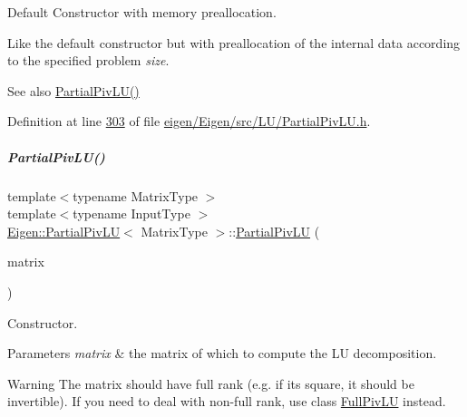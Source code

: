Default Constructor with memory preallocation. 

Like the default constructor but with preallocation of the internal data according to the specified problem {\itshape size}. \begin{DoxySeeAlso}{See also}
\hyperlink{group___l_u___module_a5c04818d354f94a98786d8a44cb709c6}{Partial\+Piv\+L\+U()} 
\end{DoxySeeAlso}


Definition at line \hyperlink{eigen_2_eigen_2src_2_l_u_2_partial_piv_l_u_8h_source_l00303}{303} of file \hyperlink{eigen_2_eigen_2src_2_l_u_2_partial_piv_l_u_8h_source}{eigen/\+Eigen/src/\+L\+U/\+Partial\+Piv\+L\+U.\+h}.

\mbox{\label{group___l_u___module_acf37214aebb54d0e186ae39ac6c41bdf}} 
\subparagraph{\texorpdfstring{Partial\+Piv\+L\+U()}{PartialPivLU()}\hspace{0.1cm}{\footnotesize\ttfamily [3/8]}}
{\footnotesize\ttfamily template$<$typename Matrix\+Type $>$ \\
template$<$typename Input\+Type $>$ \\
\hyperlink{group___l_u___module_class_eigen_1_1_partial_piv_l_u}{Eigen\+::\+Partial\+Piv\+LU}$<$ Matrix\+Type $>$\+::\hyperlink{group___l_u___module_class_eigen_1_1_partial_piv_l_u}{Partial\+Piv\+LU} (\begin{DoxyParamCaption}\item[{const \hyperlink{group___core___module_struct_eigen_1_1_eigen_base}{Eigen\+Base}$<$ Input\+Type $>$ \&}]{matrix }\end{DoxyParamCaption})\hspace{0.3cm}{\ttfamily [explicit]}}

Constructor.


\begin{DoxyParams}{Parameters}
{\em matrix} & the matrix of which to compute the LU decomposition.\\
\hline
\end{DoxyParams}
\begin{DoxyWarning}{Warning}
The matrix should have full rank (e.\+g. if it\textquotesingle{}s square, it should be invertible). If you need to deal with non-\/full rank, use class \hyperlink{group___l_u___module_class_eigen_1_1_full_piv_l_u}{Full\+Piv\+LU} instead. 
\end{DoxyWarning}



